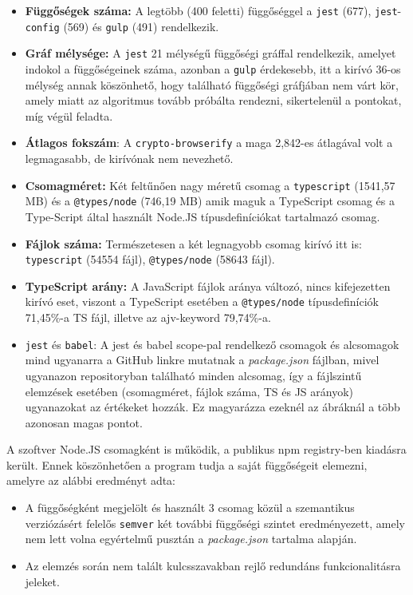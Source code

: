 \begin{itemize}
	\item \textbf{Függőségek száma:} A legtöbb (400 feletti) függőséggel a \texttt{jest} (677), \texttt{jest}-\texttt{config} (569) és \texttt{gulp} (491) rendelkezik.
	\item \textbf{Gráf mélysége:} A \texttt{jest} 21 mélységű függőségi gráffal rendelkezik, amelyet indokol a függőségeinek száma, azonban a \texttt{gulp} érdekesebb, itt a kirívó 36-os mélység annak köszönhető, hogy található függőségi gráfjában nem várt kör, amely miatt az algoritmus tovább próbálta rendezni, sikertelenül a pontokat, míg végül feladta.
	\item \textbf{Átlagos fokszám}:  A \texttt{crypto-browserify} a maga 2,842-es átlagával volt a legmagasabb, de kirívónak nem nevezhető.
	\item \textbf{Csomagméret:} Két feltűnően nagy méretű csomag a \texttt{typescript} (1541,57 MB) és a \texttt{@types/node} (746,19 MB) amik maguk a TypeScript csomag és a Type-Script által használt Node.JS típusdefiníciókat tartalmazó csomag.
	\item \textbf{Fájlok száma:} Természetesen a két legnagyobb csomag kirívó itt is: \texttt{typescript} (54554 fájl), \texttt{@types/node} (58643 fájl).
	\item \textbf{TypeScript arány:} A JavaScript fájlok aránya változó, nincs kifejezetten kirívó eset, viszont a TypeScript esetében a \texttt{@types/node} típusdefiníciók 71,45\%-a TS fájl, illetve az ajv-keyword 79,74\%-a.
	\item \texttt{jest} és \texttt{babel}: A jest és babel scope-pal rendelkező csomagok és alcsomagok mind ugyanarra a GitHub linkre mutatnak a \emph{package.json} fájlban, mivel ugyanazon repositoryban található minden alcsomag, így a fájlszintű elemzések esetében (csomagméret, fájlok száma, TS és JS arányok) ugyanazokat az értékeket hozzák. Ez magyarázza ezeknél az ábráknál a több azonosan magas pontot.
	
\end{itemize}



A szoftver Node.JS csomagként is működik, a publikus npm registry-ben kiadásra került. Ennek köszönhetően a program tudja a saját függőségeit elemezni, amelyre az alábbi eredményt adta:

\begin{itemize}
	\item A függőségként megjelölt és használt 3 csomag közül a szemantikus verziózásért felelős \texttt{semver} két további függőségi szintet eredményezett, amely nem lett volna egyértelmű pusztán a \emph{package.json} tartalma alapján.
	\item Az elemzés során nem talált kulcsszavakban rejlő redundáns funkcionalitásra jeleket.
\end{itemize}

